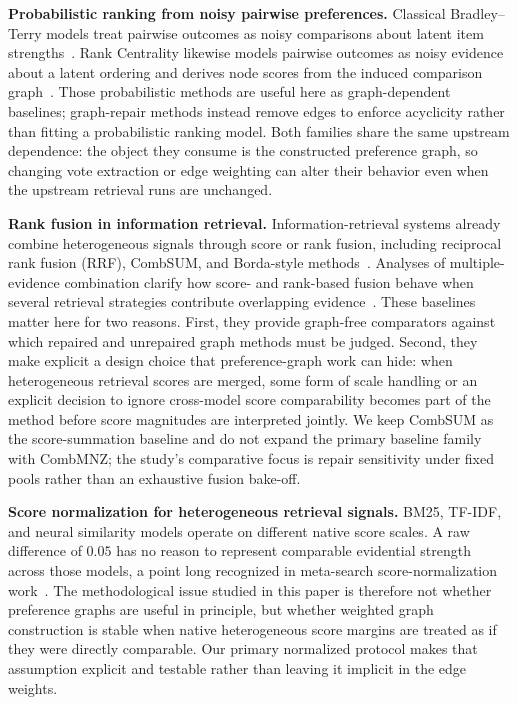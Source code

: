 \documentclass[manuscript,anonymous,review]{acmart}
\begin{document}
\textbf{Probabilistic ranking from noisy pairwise preferences.} Classical
Bradley--Terry models treat pairwise outcomes as noisy comparisons about latent
item strengths~\cite{bradley1952rank}. Rank Centrality likewise models pairwise
outcomes as noisy evidence about a latent ordering and derives node scores from
the induced comparison
graph~\cite{negahban2017rankcentrality}. Those probabilistic methods are useful
here as graph-dependent baselines; graph-repair methods instead remove edges to
enforce acyclicity rather than fitting a probabilistic ranking model. Both
families share the same upstream dependence: the object they consume is the
constructed preference graph, so changing vote extraction or edge weighting can
alter their behavior even when the upstream retrieval runs are unchanged.

\textbf{Rank fusion in information retrieval.} Information-retrieval systems
already combine heterogeneous signals through score or rank fusion, including
reciprocal rank fusion (RRF), CombSUM, and Borda-style methods~\cite{cormack2009rrf,fox1994combination,lee1997analyses}.
Analyses of multiple-evidence combination clarify how score- and
rank-based fusion behave when several retrieval strategies contribute overlapping
evidence~\cite{lee1997analyses}. These baselines matter here for two reasons.
First, they provide graph-free comparators against which repaired and unrepaired
graph methods must be judged. Second, they make explicit a design choice that
preference-graph work can hide: when heterogeneous retrieval scores are merged,
some form of scale handling or an explicit decision to ignore cross-model score
comparability becomes part of the method before score magnitudes are interpreted
jointly. We keep CombSUM as the score-summation baseline and do not expand the
primary baseline family with CombMNZ; the study's comparative focus is
repair sensitivity under fixed pools rather than an exhaustive fusion bake-off.

\textbf{Score normalization for heterogeneous retrieval signals.} BM25, TF-IDF,
and neural similarity models operate on different native score scales. A raw
difference of $0.05$ has no reason to represent comparable evidential strength
across those models, a point long recognized in meta-search score-normalization
work~\cite{manmatha2002formal}. The methodological issue studied in this paper
is therefore not whether preference graphs are useful in principle, but whether
weighted graph construction is stable when native heterogeneous score margins
are treated as if they were directly comparable. Our primary normalized protocol
makes that assumption explicit and testable rather than leaving it implicit in
the edge weights.
\end{document}
